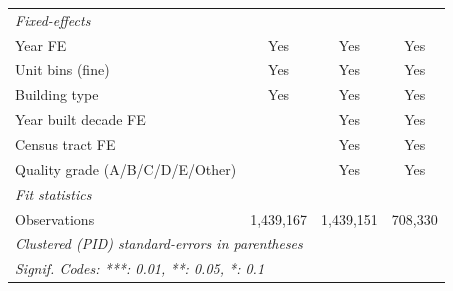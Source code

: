 \begin{tabular}{lccc}
   \midrule
   \emph{Fixed-effects}\\
   Year FE                                                                             & Yes             & Yes             & Yes\\  
   Unit bins (fine)                                                                    & Yes             & Yes             & Yes\\  
   Building type                                                                       & Yes             & Yes             & Yes\\  
   Year built decade FE                                                                &                 & Yes             & Yes\\  
   Census tract FE                                                                     &                 & Yes             & Yes\\  
   Quality grade (A/B/C/D/E/Other)                                                     &                 & Yes             & Yes\\  
   \midrule
   \emph{Fit statistics}\\
   Observations                                                                        & 1,439,167       & 1,439,151       & 708,330\\  
   \midrule \midrule
   \multicolumn{4}{l}{\emph{Clustered (PID) standard-errors in parentheses}}\\
   \multicolumn{4}{l}{\emph{Signif. Codes: ***: 0.01, **: 0.05, *: 0.1}}\\
\end{tabular}
\par\endgroup
